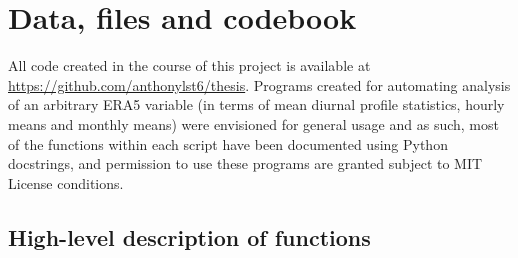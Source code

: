 \chapter{Data, files and codebook}
\label{app:code}

All code created in the course of this project is available at \url{https://github.com/anthonylst6/thesis}. Programs created for automating analysis of an arbitrary ERA5 variable (in terms of mean diurnal profile statistics, hourly means and monthly means) were envisioned for general usage and as such, most of the functions within each script have been documented using Python docstrings, and permission to use these programs are granted subject to MIT License conditions.

\section{High-level description of functions}

